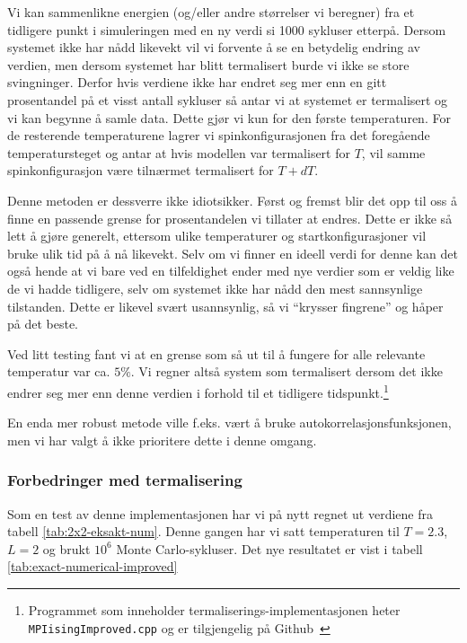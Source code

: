 \documentclass[11pt]{article}
\begin{document}
Vi kan sammenlikne energien (og/eller andre størrelser vi beregner)
fra et tidligere punkt i simuleringen med en ny verdi si 1000 sykluser
etterpå. Dersom systemet ikke har nådd likevekt vil vi forvente å se
en betydelig endring av verdien, men dersom systemet har blitt
termalisert burde vi ikke se store svingninger. Derfor hvis verdiene ikke har endret
seg mer enn en gitt prosentandel på et visst antall sykluser så antar vi at
systemet er termalisert og vi kan begynne å samle data. Dette gjør vi
kun for den første temperaturen. For de resterende temperaturene lagrer
vi spinkonfigurasjonen fra det foregående temperatursteget og antar at hvis
modellen var termalisert for $T$, vil samme spinkonfigurasjon være tilnærmet
termalisert for $T+dT$.

Denne metoden er dessverre ikke idiotsikker. Først og fremst blir
det opp til oss å finne en passende grense for prosentandelen vi
tillater at endres. Dette er ikke så lett å gjøre generelt, ettersom
ulike temperaturer og startkonfigurasjoner vil bruke ulik tid på å nå
likevekt. Selv om vi finner en ideell verdi for denne kan det også hende
at vi bare ved en tilfeldighet ender med nye verdier som er veldig
like de vi hadde tidligere, selv om systemet ikke har nådd den mest
sannsynlige tilstanden. Dette er likevel svært usannsynlig, så vi
``krysser fingrene'' og håper på det beste.

Ved litt testing fant vi at en grense som så ut til å fungere for alle relevante
temperatur var ca. $5\%$. Vi regner altså system som termalisert
dersom det ikke endrer seg mer enn denne verdien i forhold til et
tidligere tidspunkt.\footnote{Programmet som inneholder termaliserings-implementasjonen heter \texttt{MPIisingImproved.cpp} og er
tilgjengelig på Github~\cite{github-repo}}

En enda mer robust metode ville f.eks. vært å bruke autokorrelasjonsfunksjonen,
men vi har valgt å ikke prioritere dette i denne omgang.

\subsubsection{Forbedringer med termalisering}
Som en test av denne implementasjonen har vi på nytt regnet ut
verdiene fra tabell \ref{tab:2x2-eksakt-num}. Denne gangen har vi satt
temperaturen til $T=2.3$, $L=2$ og brukt $10^6$ Monte
Carlo-sykluser. Det nye resultatet er vist i tabell \ref{tab:exact-numerical-improved}
\end{document}
